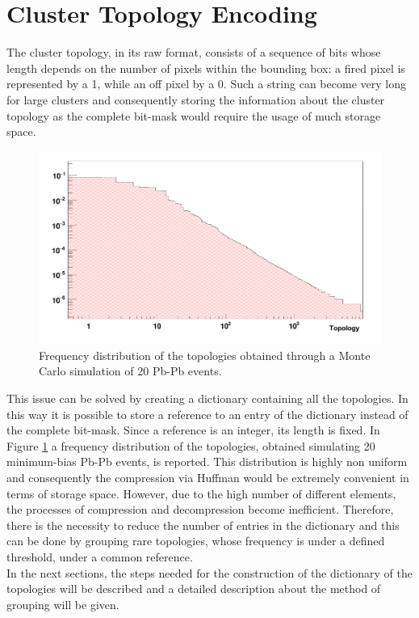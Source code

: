 \section{Cluster Topology Encoding}
The cluster topology, in its raw format, consists of a sequence of bits whose length depends on the number of pixels within the bounding box: a fired pixel is represented by a 1, while an off pixel by a 0. Such a string can become very long for large clusters and consequently storing the information about the cluster topology as the complete bit-mask would require the usage of much storage space.
%
\begin{figure}
  \centering
  \includegraphics[scale=0.4]{figures/topdistro.png}
  \caption{Frequency distribution of the topologies obtained through a Monte Carlo simulation of 20 Pb-Pb events.}
  \label{fig:topdistro}
\end{figure}
%
This issue can be solved by creating a dictionary containing all the topologies. In this way it is possible to store a reference to an entry of the dictionary instead of the complete bit-mask. Since a reference is an integer, its length is fixed. In Figure \ref{fig:topdistro} a frequency distribution of the topologies, obtained simulating 20 minimum-bias Pb-Pb events, is reported. This distribution is highly non uniform and consequently the compression via Huffman would be extremely convenient in terms of storage space. However, due to the high number of different elements, the processes of compression and decompression become inefficient. Therefore, there is the necessity to reduce the number of entries in the dictionary and this can be done by grouping rare topologies, whose frequency is under a defined threshold, under a common reference.\\
In the next sections, the steps needed for the construction of the dictionary of the topologies will be described and a detailed description about the method of grouping will be given.
